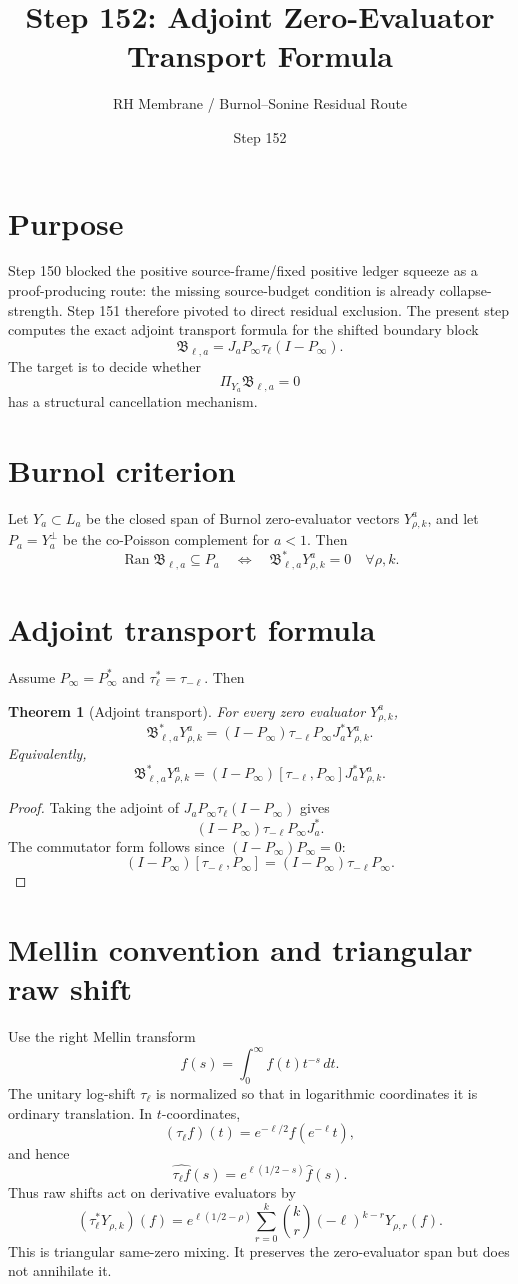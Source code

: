 \documentclass[11pt]{article}
\title{Step 152: Adjoint Zero-Evaluator Transport Formula}
\author{RH Membrane / Burnol--Sonine Residual Route}
\date{Step 152}
\newtheorem{theorem}{Theorem}
\begin{document}
\maketitle

\section{Purpose}
Step 150 blocked the positive source-frame/fixed positive ledger squeeze as a proof-producing route: the missing source-budget condition is already collapse-strength. Step 151 therefore pivoted to direct residual exclusion. The present step computes the exact adjoint transport formula for the shifted boundary block
\[
\mathfrak B_{\ell,a}=J_aP_\infty\tau_\ell(I-P_\infty).
\]
The target is to decide whether
\[
\Pi_{Y_a}\mathfrak B_{\ell,a}=0
\]
has a structural cancellation mechanism.

\section{Burnol criterion}
Let \(Y_a\subset L_a\) be the closed span of Burnol zero-evaluator vectors \(Y^a_{\rho,k}\), and let \(P_a=Y_a^\perp\) be the co-Poisson complement for \(a<1\). Then
\[
\operatorname{Ran}\mathfrak B_{\ell,a}\subseteq P_a
\quad\Longleftrightarrow\quad
\mathfrak B_{\ell,a}^*Y^a_{\rho,k}=0
\quad\forall \rho,k.
\]

\section{Adjoint transport formula}
Assume \(P_\infty=P_\infty^*\) and \(\tau_\ell^*=\tau_{-\ell}\). Then
\begin{theorem}[Adjoint transport]
For every zero evaluator \(Y^a_{\rho,k}\),
\[
\boxed{
\mathfrak B_{\ell,a}^*Y^a_{\rho,k}
=
(I-P_\infty)\tau_{-\ell}P_\infty J_a^*Y^a_{\rho,k}.
}
\]
Equivalently,
\[
\boxed{
\mathfrak B_{\ell,a}^*Y^a_{\rho,k}
=
(I-P_\infty)[\tau_{-\ell},P_\infty]J_a^*Y^a_{\rho,k}.
}
\]
\end{theorem}
\begin{proof}
Taking the adjoint of \(J_aP_\infty\tau_\ell(I-P_\infty)\) gives
\[
(I-P_\infty)\tau_{-\ell}P_\infty J_a^*.
\]
The commutator form follows since \((I-P_\infty)P_\infty=0\):
\[
(I-P_\infty)[\tau_{-\ell},P_\infty]
=(I-P_\infty)\tau_{-\ell}P_\infty.
\]
\end{proof}

\section{Mellin convention and triangular raw shift}
Use the right Mellin transform
\[
\widehat f(s)=\int_0^\infty f(t)t^{-s}\,dt.
\]
The unitary log-shift \(\tau_\ell\) is normalized so that in logarithmic coordinates it is ordinary translation. In \(t\)-coordinates,
\[
(\tau_\ell f)(t)=e^{-\ell/2}f(e^{-\ell}t),
\]
and hence
\[
\widehat{\tau_\ell f}(s)=e^{\ell(1/2-s)}\widehat f(s).
\]
Thus raw shifts act on derivative evaluators by
\[
(\tau_\ell^*Y_{\rho,k})(f)
=e^{\ell(1/2-\rho)}\sum_{r=0}^k {k\choose r}(-\ell)^{k-r}Y_{\rho,r}(f).
\]
This is triangular same-zero mixing. It preserves the zero-evaluator span but does not annihilate it.
\end{document}
